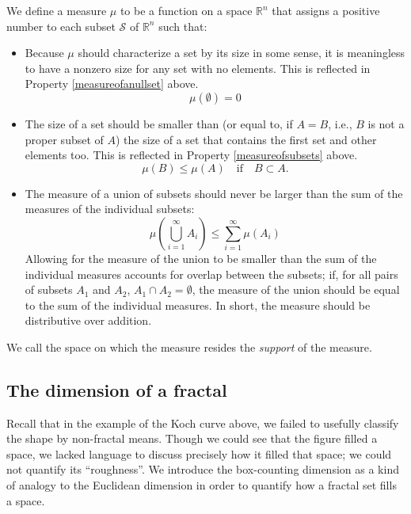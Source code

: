 \begin{mydef}
We define a measure $ \mu $ to be a function on a space $ \mathbb{R}^{n} $ that assigns a positive number to each subset $ \mathcal{S} $ of $ \mathbb{R}^{n} $ such that:

\begin{itemize}
\item Because $\mu$ should characterize a set by its size in some sense, it is meaningless to have a nonzero size for any set with no elements. This is reflected in Property \ref{measureofanullset} above.
\begin{equation}
\mu(\emptyset) = 0
\end{equation}
\item The size of a set should be smaller than (or equal to, if $ A = B $, i.e., $B$ is not a proper subset of $A$) the size of a set that contains the first set and other elements too. This is reflected in Property \ref{measureofsubsets} above.
\begin{equation}
\mu(B) \le \mu(A) \mathrm{ \quad if \quad }  B \subset A.
\end{equation} 
\item The measure of a union of subsets should never be larger than the sum of the measures of the individual subsets: 
\begin{equation}
\mu\left(\bigcup_{i=1}^{\infty} A_i\right) \le \sum_{i=1}^{\infty} \mu(A_i) 
\end{equation}
Allowing for the measure of the union to be smaller than the sum of the individual measures accounts for overlap between the subsets; if, for all pairs of subsets $A_1$ and $A_2$, $A_1 \cap A_2 = \emptyset$, the measure of the union should be equal to the sum of the individual measures. In short, the measure should be distributive over addition.
\end{itemize}
We call the space on which the measure resides the \textit{support} of the measure.
\end{mydef}

\subsection{The dimension of a fractal}
Recall that in the example of the Koch curve above, we failed to usefully classify the shape by non-fractal means. Though we could see that the figure filled a space, we lacked language to discuss precisely how it filled that space; we could not quantify its ``roughness''. We introduce the box-counting dimension as a kind of analogy to the Euclidean dimension in order to quantify how a fractal set fills a space.

